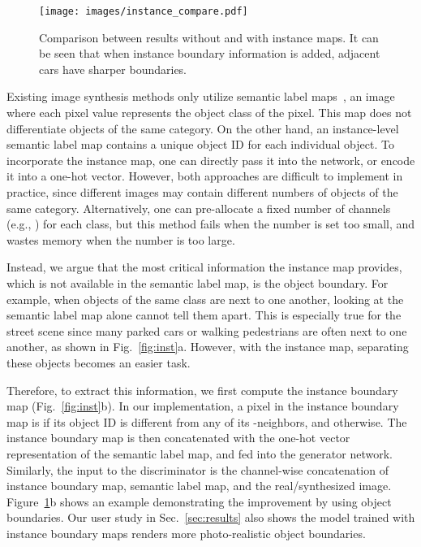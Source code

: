 \documentclass[10pt,twocolumn,letterpaper]{article}
\newcommand{\reffig}[1]{Fig.~\ref{fig:#1}}
\newcommand{\refsec}[1]{Sec.~\ref{sec:#1}}
\newcommand{\lblfig}[1]{\label{fig:#1}}
\begin{document}
\begin{figure}
  \centering
  \texttt{[image: images/instance\_compare.pdf]}   
  \caption{Comparison between results without and with instance maps. It can be seen that when instance boundary information is added, adjacent cars have sharper boundaries.}
  \lblfig{inst_compare}
\end{figure}

Existing image synthesis methods only utilize semantic label maps~\cite{isola2016image,karacan2016learning,chen2017photographic}, an image where each pixel value represents the object class of the pixel. This map does not differentiate objects of the same category. On the other hand, an instance-level semantic label map contains a unique object ID for each individual object. 
To incorporate the instance map, one can directly pass it into the network, or encode it into a one-hot vector. However, both approaches are difficult to implement in practice, since different images may contain different numbers of objects of the same category. Alternatively, one can pre-allocate a fixed number of channels (e.g., ) for each class, but this method fails when the number is set too small, and wastes memory when the number is too large.

Instead, we argue that the most critical information the instance map provides, which is not available in the semantic label map, is the object boundary. 
For example, when objects of the same class are next to one another, looking at the semantic label map alone cannot tell them apart. This is especially true for the street scene since many parked cars or walking pedestrians are often next to one another, as shown in \reffig{inst}a. However, with the instance map, separating these objects becomes an easier task.

Therefore, to extract this information, we first compute the instance boundary map (\reffig{inst}b). In our implementation, a pixel in the instance boundary map is  if its object ID is different from any of its -neighbors, and  otherwise. 
The instance boundary map is then concatenated with the one-hot vector representation of the semantic label map, and fed into the generator network. 
Similarly, the input to the discriminator is the channel-wise concatenation of instance boundary map, semantic label map, and the real/synthesized image. Figure~\ref{fig:inst_compare}b shows an example demonstrating the improvement by using object boundaries. 
Our user study in \refsec{results} also shows the model trained with instance boundary maps renders more photo-realistic object boundaries.
\end{document}
